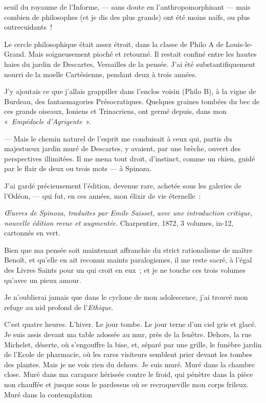 \quebra

\noindent{}seuil du royaume de
l'Informe, --- sans doute en l'anthropomorphisant --- mais combien de
philosophes (et je dis des plus grands) ont été moins naïfs, ou plus
outrecuidants~!

Le cercle philosophique était assez étroit, dans la classe de Philo A de
Louis-le-Grand. Mais soigneusement pioché et retourné. Il restait
confiné entre les hautes haies du jardin de Descartes, Versailles de la
pensée. J'ai été substantifiquement nourri de la moelle Cartésienne,
pendant deux à trois années.

J'y ajoutais ce que j'allais grappiller dans l'enclos voisin (Philo B),
à la vigne de Burdeau, des fantasmagories Présocratiques. Quelques
graines tombées du bec de ces grands oiseaux, Ioniens et Trinacriens,
ont germé depuis, dans mon «~\emph{Empédocle d'Agrigente}~».

--- Mais le chemin naturel de l'esprit me conduisait à ceux qui, partis
du majestueux jardin muré de Descartes, y avaient, par une brèche,
ouvert des perspectives illimitées. Il me mena tout droit, d'instinct,
comme un chien, guidé par le flair de deux ou trois mots --- à Spinoza.

J'ai gardé précieusement l'édition, devenue rare, achetée sous les
galeries de l'Odéon, --- qui fut, en ces années, mon élixir de vie
éternelle~:

\emph{\OE uvres de Spinoza, traduites par Emile Saisset, avec une
introduction critique, nouvelle édition revue et augmentée}.
Charpentier, 1872, 3 volumes, in-12, cartonnés en vert.

Bien que ma pensée soit maintenant affranchie du strict rationalisme de
maître Benoît, et qu'elle en ait reconnu maints paralogismes, il me
reste sacré, à l'égal des Livres Saints pour un qui croit en eux~; et je
ne touche ces trois volumes qu'avec un pieux amour.

Je n'oublierai jamais que dans le cyclone de mon adolescence, j'ai
trouvé mon refuge au nid profond de l'\emph{Ethique}.

C'est quatre heures. L'hiver. Le jour tombe. Le jour terne d'un ciel
gris et glacé. Je suis assis devant ma table adossée au mur, près de la
fenêtre. Dehors, la rue Michelet, déserte, où s'engouffre la bise, et,
séparé par une grille, le funèbre jardin de l'Ecole de pharmacie, où les
rares visiteurs semblent prier devant les tombes des plantes.
Mais je ne vois rien du dehors. Je suis muré. Muré
dans la chambre close. Muré dans ma carapace hérissée contre le froid,
qui pénètre dans la pièce non chauffée et jusque sous le pardessus où se
recroqueville mon corps frileux. Muré dans la contemplation \linebreak

